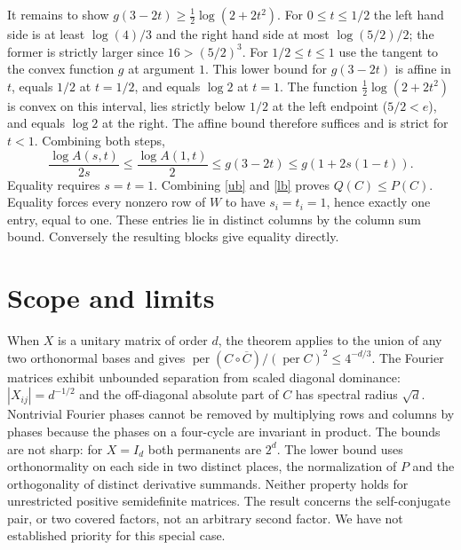 \documentclass[11pt]{article}
\newcommand{\per}{\operatorname{per}}
\begin{document}
It remains to show $g(3-2t)\ge\tfrac12\log(2+2t^2)$.
For $0\le t\le1/2$ the left hand side is at least $\log(4)/3$ and
the right hand side at most $\log(5/2)/2$; the former is strictly
larger since $16>(5/2)^3$.
For $1/2\le t\le1$ use the tangent to the convex function $g$ at
argument $1$. This lower bound for $g(3-2t)$ is affine in $t$,
equals $1/2$ at $t=1/2$, and equals $\log2$ at $t=1$.
The function $\tfrac12\log(2+2t^2)$ is convex on this interval, lies
strictly below $1/2$ at the left endpoint ($5/2<e$), and equals
$\log2$ at the right. The affine bound therefore suffices and is
strict for $t<1$. Combining both steps,
\[
 \frac{\log A(s,t)}{2s}\le
 \frac{\log A(1,t)}2\le g(3-2t)
 \le g(1+2s(1-t)).
\]
Equality requires $s=t=1$. Combining \eqref{ub} and \eqref{lb} proves
$Q(C)\le P(C)$. Equality forces every nonzero row of $W$ to have
$s_i=t_i=1$, hence exactly one entry, equal to one. These entries lie
in distinct columns by the column sum bound. Conversely the resulting
blocks give equality directly.

\section{Scope and limits}
When $X$ is a unitary matrix of order $d$, the theorem applies to
the union of any two orthonormal bases and gives
$\per(C\circ\overline C)/(\per C)^2\le 4^{-d/3}$.
The Fourier matrices exhibit unbounded separation from scaled diagonal
dominance: $|X_{ij}|=d^{-1/2}$ and the off-diagonal absolute part of
$C$ has spectral radius $\sqrt d$. Nontrivial Fourier phases cannot be
removed by multiplying rows and columns by phases because the phases on
a four-cycle are invariant in product. The bounds are not sharp: for
$X=I_d$ both permanents are $2^d$. The lower bound uses orthonormality
on each side in two distinct places, the normalization of $P$ and the
orthogonality of distinct derivative summands. Neither property holds for
unrestricted positive semidefinite matrices. The result concerns the
self-conjugate pair, or two covered factors, not an arbitrary second
factor. We have not established priority for this special case.
\end{document}

